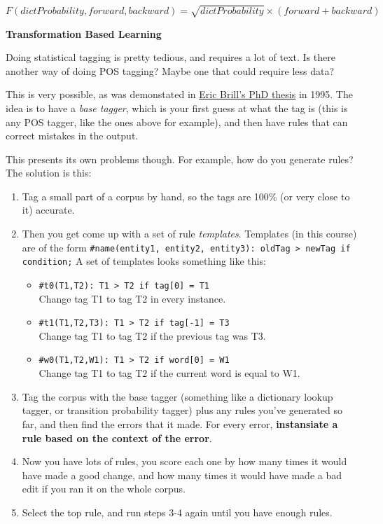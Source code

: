 \begin{description}
  \[
    F(dictProbability, forward, backward) = \sqrt{dictProbability} \times 
      (forward + backward)
  \]

  \item \textbf{Transformation Based Learning}\\


  Doing statistical tagging is pretty tedious, and requires a lot of text. Is
  there another way of doing POS tagging? Maybe one that could require less
  data?

  This is very possible, as was demonstated in
  \href{http://dl.acm.org/citation.cfm?doid=974499.974526}{Eric Brill's PhD
  thesis} in 1995. The idea is to have a \textit{base tagger}, which is your 
  first guess at what the tag is (this is any POS tagger, like the ones above 
  for example), and then have rules that can correct mistakes in the output.

  This presents its own problems though. For example, how do you generate 
  rules? The solution is this:

  \begin{enumerate}
    \item Tag a small part of a corpus by hand, so the tags are 100\% (or very 
    close to it) accurate.
    \item Then you get come up with a set of rule \textit{templates}. Templates 
    (in this course) are of the form
    \texttt{\#name(entity1, entity2, entity3): oldTag > newTag if condition;} A 
    set of templates looks something like this:
    \begin{itemize}
      \item \texttt{\#t0(T1,T2): T1 > T2 if tag[0] = T1}\\
        Change tag T1 to tag T2 in every instance.
      \item \texttt{\#t1(T1,T2,T3): T1 > T2 if tag[-1] = T3}\\
        Change tag T1 to tag T2 if the previous tag was T3.
      \item \texttt{\#w0(T1,T2,W1): T1 > T2 if word[0] = W1}\\
        Change tag T1 to tag T2 if the current word is equal to W1.
    \end{itemize}
    \item Tag the corpus with the base tagger (something like a dictionary 
    lookup tagger, or transition probability tagger) plus any rules you've 
    generated so far, and then find the errors that it made. For every error,
    \textbf{instansiate a rule based on the context of the error}.
    \item Now you have lots of rules, you score each one by how many times it 
    would have made a good change, and how many times it would have made a bad 
    edit if you ran it on the whole corpus.
    \item Select the top rule, and run steps 3-4 again until you have enough 
    rules.
  \end{enumerate}


\end{description}
